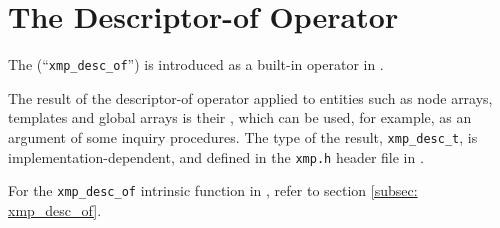 \section{The Descriptor-of Operator}
\label{sec:Descriptor of Global Data in C}


The  (``{\tt xmp\_desc\_of}'') is
introduced as a built-in operator in {\XMPC}.

The result of the descriptor-of operator applied to {\XMP} entities such
as node arrays, templates and global arrays is their {\it
{}}, which can be used, for example, as an argument of
some inquiry procedures. The type of the result, {\tt xmp\_desc\_t}, is
implementation-dependent, and defined in the {\tt xmp.h} header file in
{\XMPC}.

For the {\tt xmp\_desc\_of} intrinsic function in {\XMPF}, refer to
section \ref{subsec: xmp_desc_of}.

